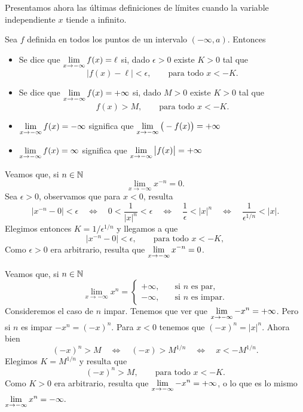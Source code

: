 Presentamos ahora las últimas definiciones de límites cuando la variable independiente $x$ tiende a infinito.
\begin{definition}
    Sea $f$ definida en todos los puntos de un intervalo $(-\infty,a)$. Entonces
    \begin{itemize}
        \item Se dice que $\displaystyle\lim_{x\to -\infty} f(x) = \ell$ si, dado $\epsilon>0$ existe $K>0$ tal que 
        \[
        |f(x)-\ell|<\epsilon,
        \qquad\text{para todo $x<-K$}.
        \]
        \item Se dice que $\displaystyle\lim_{x\to -\infty} f(x) = +\infty$ si, dado $M>0$ existe $K>0$ tal que 
        \[
        f(x)>M,
        \qquad\text{para todo $x<-K$}.
        \]
        \item $\displaystyle\lim_{x\to -\infty} f(x) = -\infty$ significa que $\displaystyle\lim_{x\to -\infty}\big(- f(x)\big) = +\infty$
        \item $\displaystyle\lim_{x\to -\infty} f(x) = \infty$ significa que $\displaystyle\lim_{x\to -\infty}\big|f(x)\big| = +\infty$
    \end{itemize}
\end{definition}

\begin{example}
    Veamos que, si $n\in\mathbb{N}$
    \[
    \lim_{x\to-\infty} x^{-n} = 0.
    \]
    Sea $\epsilon>0$, observamos que para $x<0$, resulta
    \[
    |x^{-n}-0|<\epsilon
    \quad\iff\quad
    0<\frac{1}{|x|^n}<\epsilon
    \quad\iff\quad
    \frac1\epsilon<|x|^n
    \quad\iff\quad
    \frac1{\epsilon^{1/n}}<|x|.
    \]
    Elegimos entonces $K=1/{\epsilon^{1/n}}$ y llegamos a que
    \[
    | x^{-n} - 0| < \epsilon, 
    \qquad\text{para todo $x<-K$},
    \]
    Como $\epsilon>0$ era arbitrario, resulta que $\displaystyle\lim_{x\to-\infty} x^{-n} = 0$.
\end{example}

\begin{example}
    Veamos que, si $n\in\mathbb{N}$
    \[
    \lim_{x\to-\infty} x^{n} = \begin{cases} 
    +\infty, \quad&\text{si $n$ es par,}\\
    -\infty, \quad&\text{si $n$ es impar.}
    \end{cases}
    \]
    Consideremos el caso de $n$ impar.
    Tenemos que ver que $\displaystyle\lim_{x\to-\infty} -x^{n} = +\infty$.
    Pero si $n$ es impar $-x^n = (-x)^n$. Para $x<0$ tenemos que $(-x)^n=|x|^n$.
    Ahora bien 
    \[
    (-x)^n > M 
    \quad\iff\quad
    (-x) > M^{1/n}
    \quad\iff\quad
    x < - M^{1/n}.
    \]
    Elegimos $K = M^{1/n}$ y resulta que 
    \[
    (-x)^n > M ,
    \qquad\text{para todo $x<-K$}.
    \]
    Como $K>0$ era arbitrario, resulta que $\displaystyle\lim_{x\to-\infty} -x^{n} = +\infty$, o lo que es lo mismo $\displaystyle\lim_{x\to-\infty} x^{n} = -\infty.$
\end{example}

